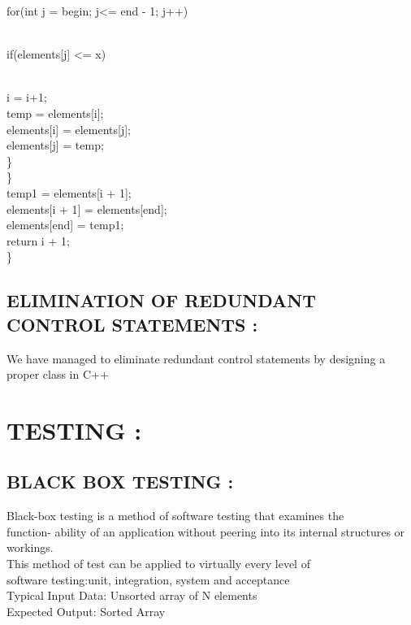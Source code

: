 \documentclass{article}
\begin{document}
	for(int j = begin; j<= end - 1; j++) {\\
		if(elements[j] <= x) {\\
			i = i+1;\\
			temp = elements[i];\\
			elements[i] = elements[j];\\
			elements[j] = temp;\\
			\}\\
			\}\\
			temp1 = elements[i + 1];\\
			elements[i + 1] = elements[end];\\
			elements[end] = temp1;\\
			return i + 1;\\
			\}\\
			
			\subsection{ELIMINATION OF REDUNDANT CONTROL STATEMENTS : } We have managed to eliminate redundant control statements by designing a proper class in C++
			
			\section{TESTING :}
			
			\subsection{BLACK BOX TESTING : }
			Black-box testing is a method of software testing that examines the\\ function- ability of an application without peering into its internal structures or workings.\\
			This method of test can be applied to virtually every level of\\ software testing:unit, integration, system and acceptance\\
			Typical Input Data:  Unsorted array of N elements \\
			Expected Output:     Sorted Array\\
			
}}
\end{document}
